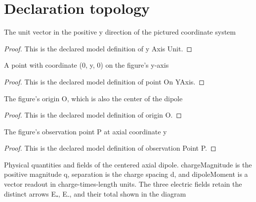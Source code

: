 \section{Declaration topology}
\begin{definition}
  \label{def:physics:phyx-mini-0997:phyxminiproblems-problemphyxmini0997-yaxisunit}
  The unit vector in the positive y direction of the pictured coordinate system
\end{definition}
\begin{proof}
  This is the declared model definition of y Axis Unit.
\end{proof}
\begin{definition}
  \label{def:physics:phyx-mini-0997:phyxminiproblems-problemphyxmini0997-pointonyaxis}
  A point with coordinate (0, y, 0) on the figure's y-axis
\end{definition}
\begin{proof}
  This is the declared model definition of point On YAxis.
\end{proof}
\begin{definition}[origin O]
  \label{def:physics:phyx-mini-0997:phyxminiproblems-problemphyxmini0997-origino}
  The figure's origin O, which is also the center of the dipole
\end{definition}
\begin{proof}
  This is the declared model definition of origin O.
\end{proof}
\begin{definition}
  \label{def:physics:phyx-mini-0997:phyxminiproblems-problemphyxmini0997-observationpointp}
  The figure's observation point P at axial coordinate y
\end{definition}
\begin{proof}
  This is the declared model definition of observation Point P.
\end{proof}
\begin{definition}
  \label{def:physics:phyx-mini-0997:phyxminiproblems-problemphyxmini0997-axialelectricdipole}
  Physical quantities and fields of the centered axial dipole. chargeMagnitude is the positive magnitude q, separation is the charge spacing d, and dipoleMoment is a vector readout in charge-times-length units. The three electric fields retain the distinct arrows E₊, E₋, and their total shown in the diagram
\end{definition}
